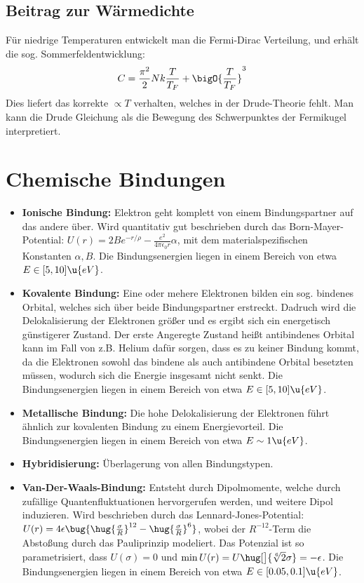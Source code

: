 \documentclass[bfvec]{summery_5.0}
\begin{document}
\subsection{Beitrag zur Wärmedichte}
Für niedrige Temperaturen entwickelt man die Fermi-Dirac Verteilung, und erhält die sog. Sommerfeldentwicklung:
\begin{align*}
    C = \frac{\pi^2}{2}Nk \frac T {T_F} + \bigO{\frac{T}{T_F}}^3
\end{align*}
Dies liefert das korrekte $\propto T$ verhalten, welches in der Drude-Theorie fehlt. Man kann die Drude Gleichung als die Bewegung des Schwerpunktes der Fermikugel interpretiert.

\section{Chemische Bindungen}
\begin{itemize}
    \item {\bf Ionische Bindung:} Elektron geht komplett von einem Bindungspartner auf das andere über. Wird quantitativ gut beschrieben durch das Born-Mayer-Potential: $U(r) = 2Be^{-r/\rho}-\frac{e^2}{4\pi\epsilon_0 r}\alpha $, mit dem materialspezifischen Konstanten $\alpha, B$. Die Bindungsenergien liegen in einem Bereich von etwa $E\in[5,10]\u {eV}$.
    \item {\bf Kovalente Bindung:} Eine oder mehere Elektronen bilden ein sog. bindenes Orbital, welches sich über beide Bindungspartner erstreckt. Dadruch wird die Delokalisierung der Elektronen größer und es ergibt sich ein energetisch günstigerer Zustand. Der erste Angeregte Zustand heißt antibindenes Orbital kann im Fall von z.B. Helium dafür sorgen, dass es zu keiner Bindung kommt, da die Elektronen sowohl das bindene als auch antibindene Orbital besetzten müssen, wodurch sich die Energie insgesamt nicht senkt. Die Bindungsenergien liegen in einem Bereich von etwa $E\in [5,10]\u{eV}$.
    \item {\bf Metallische Bindung:} Die hohe Delokalisierung der Elektronen führt ähnlich zur kovalenten Bindung zu einem Energievorteil. Die Bindungsenergien liegen in einem Bereich von etwa $E\sim1\u{eV}$.
    \item {\bf Hybridisierung:} Überlagerung von allen Bindungstypen. 
    \item {\bf Van-Der-Waals-Bindung:} Entsteht durch Dipolmomente, welche durch zufällige Quantenfluktuationen hervorgerufen werden, und weitere Dipol induzieren. Wird beschrieben durch das Lennard-Jones-Potential: $U(r) = 4\epsilon\bug{\hug{\frac \sigma R}^{12} - \hug{\frac{\sigma}{R}}^6}$, wobei der $R^{-12}$-Term die Abstoßung durch das Pauliprinzip modeliert. Das Potenzial ist so parametrisiert, dass $U(\sigma)=0$ und $\min U(r) = U\hug[\big]{\sqrt[6]2\sigma }= -\epsilon$. Die Bindungsenergien liegen in einem Bereich von etwa $E\in [0.05, 0.1]\u{eV}$.
\end{itemize}
\end{document}
